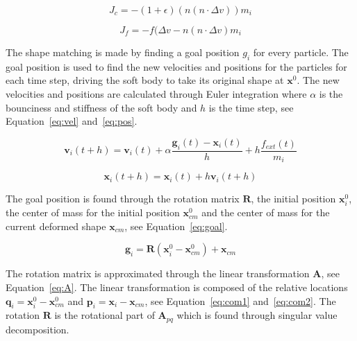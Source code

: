     \begin{equation} \label{eq:col}
        J_c = -(1 + \epsilon)(n(n\cdot{\Delta{v}}))m_i
    \end{equation}

    \begin{equation} \label{eq:fric}
        J_f = -f(\Delta{v} - n(n\cdot{\Delta{v}})m_i
    \end{equation}

    The shape matching is made by finding a goal position $g_i$ for every particle.
    The goal position is used to find the new velocities and positions for the particles for each time step, driving the soft body to take its original shape at $\mathbf{x}^0$.
    The new velocities and positions are calculated through Euler integration where $\alpha$ is the bounciness and stiffness of the soft body and $h$ is the time step, see Equation~\ref{eq:vel} and~\ref{eq:pos}.

    \begin{equation} \label{eq:vel}
        \mathbf{v}_i(t + h) = \mathbf{v}_i(t) + \alpha{\frac{\mathbf{g}_i(t) - \mathbf{x}_i(t)}{h}} + h \frac{f_{ext}(t)}{m_i}
    \end{equation}

    \begin{equation} \label{eq:pos}
        \mathbf{x}_i(t + h) = \mathbf{x}_i(t) + h\mathbf{v}_i(t + h) 
    \end{equation}

    The goal position is found through the rotation matrix $\mathbf{R}$, the initial position $\mathbf{x}^0_i$, the center of mass for the initial position $\mathbf{x}^0_{cm}$ and the center of mass for the current deformed shape $\mathbf{x}_{cm}$, see Equation~\ref{eq:goal}.
   
    \begin{equation}\label{eq:goal}
        \mathbf{g}_i = \mathbf{R}(\mathbf{x}^0_i - \mathbf{x}^0_{cm}) + \mathbf{x}_{cm}
    \end{equation}

    The rotation matrix is approximated through the linear transformation $\mathbf{A}$, see Equation~\ref{eq:A}.
    The linear transformation is composed of the relative locations $\mathbf{q}_i = \mathbf{x}^0_i - \mathbf{x}^0_{cm}$ and $\mathbf{p}_i = \mathbf{x}_i - \mathbf{x}_{cm}$, see Equation~\ref{eq:com1} and~\ref{eq:com2}.
    The rotation $\mathbf{R}$ is the rotational part of $\mathbf{A}_{pq}$ which is found through singular value decomposition.

